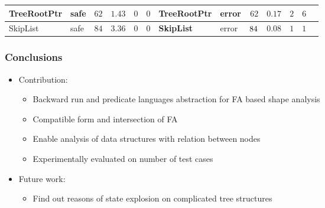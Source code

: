 \documentclass{beamer}
\newcommand{\hlgr}[1]{\textcolor{olive!50!green}{#1}}
\newcommand{\hcol}[1]{yellow!20!orange!20}
\newcommand{\ucol}[1]{red!50}
\newcommand{\scol}[1]{blue!40}
\newcommand{\safe}[0]{safe}
\newcommand{\unsafe}[0]{error}
\begin{document}
\begin{frame}
\begin{center}
\begin{adjustbox}{max height=\textheight, max width=\textwidth}
\begin{tabular}{| l | l | r | r | r | r || l | l | r | r | r | r | r |}
		\hline
		TreeRootPtr & \cellcolor{\scol{}} \safe & $62$ &  $1.43$  & $0$  &  $0$ & \cellcolor{\hcol{}}\textbf{TreeRootPtr} & \cellcolor{\ucol{}}\unsafe & \cellcolor{\hcol{}} $62$ & \cellcolor{\hcol{}} $0.17$  & \cellcolor{\hcol{}} $2$ & \cellcolor{\hcol{}} $6$\\
        \hline
		SkipList    & \cellcolor{\scol{}} \safe & $84$ & $3.36$  & $0$  & $0$ & \cellcolor{\hcol{}}\textbf{SkipList} & \cellcolor{\ucol{}}\unsafe & $\cellcolor{\hcol{}} 84$ & \cellcolor{\hcol{}} $0.08$  & \cellcolor{\hcol{}} $1$  & \cellcolor{\hcol{}} $1$ \\
        \hline
	\end{tabular}
	\label{tab:times}
	\end{adjustbox}	
	\end{center}

\end{frame}


\begin{frame}
  \frametitle{Conclusions}

  \begin{itemize}
	  \item \hlgr{Contribution:}
		\begin{itemize}
			\item Backward run and predicate languages abstraction for FA based shape analysis 
			\item Compatible form and intersection of FA
			\item Enable analysis of data structures with relation between nodes
			\item Experimentally evaluated on number of test cases
		\end{itemize}
		\item \hlgr{Future work:}
			\begin{itemize}
				\item Find out reasons of state explosion on complicated tree structures
			\end{itemize}
  \end{itemize}
\end{frame}
\end{document}

